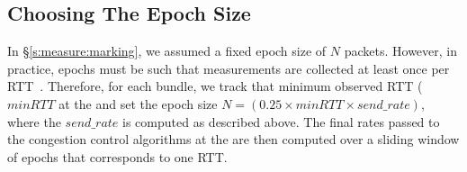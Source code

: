 


\subsection{Choosing The Epoch Size}
\label{s:measure:epoch}
%

In \S\ref{s:measure:marking}, we assumed a fixed epoch size of $N$ packets. However, in practice, epochs must be such that measurements are collected at least once per RTT~\cite{ccp}. Therefore, for each bundle, we track that minimum observed RTT ($minRTT$ at the \inbox and set the epoch size $N = (0.25 \times minRTT \times send\_rate)$, where the $send\_rate$ is computed as described above. The final rates passed to the congestion control algorithms at the \inbox are then computed over a sliding window of epochs that corresponds to one RTT. 


